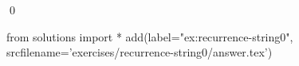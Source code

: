 
\begin{ex} 
  \label{ex:recurrence-string0}
  
  \qed
\end{ex} 
\begin{python0}
from solutions import *
add(label="ex:recurrence-string0",
    srcfilename='exercises/recurrence-string0/answer.tex') 
\end{python0}
